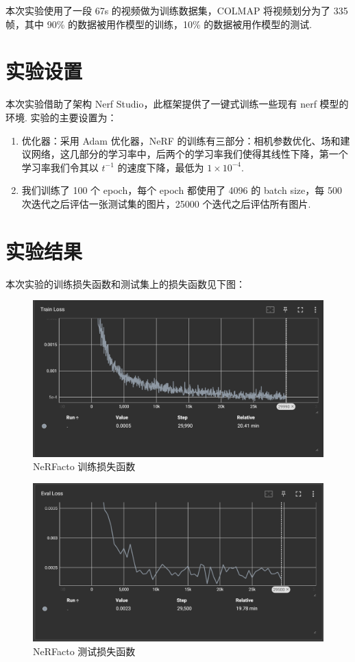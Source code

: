 \documentclass[notitlepage,cs4size,punct,oneside]{ctexrep}
\numberwithin{equation}{chapter}
\theoremstyle{mystyle}
\begin{document}
本次实验使用了一段 67s 的视频做为训练数据集，COLMAP 将视频划分为了 335 帧，其中 90\% 的数据被用作模型的训练，10\% 的数据被用作模型的测试.


\section{实验设置}
本次实验借助了架构 Nerf Studio，此框架提供了一键式训练一些现有 nerf 模型的环境. 实验的主要设置为：
\begin{enumerate}
    \item 优化器：采用 Adam 优化器，NeRF 的训练有三部分：相机参数优化、场和建议网络，这几部分的学习率中，后两个的学习率我们使得其线性下降，第一个学习率我们令其以 $t^{-1}$ 的速度下降，最低为 $1\times 10^{-4}$.

    \item 我们训练了 100 个 epoch，每个 epoch 都使用了 4096 的 batch size，每 500 次迭代之后评估一张测试集的图片，25000 个迭代之后评估所有图片.
\end{enumerate}


\section{实验结果}
本次实验的训练损失函数和测试集上的损失函数见下图：
\begin{figure}[htpb!]
    \centering
    \includegraphics[width=1\linewidth]{nerfloss.png}
    \caption{NeRFacto 训练损失函数}
    \label{fig:enter-label}
\end{figure}

\begin{figure}[htpb!]
    \centering
    \includegraphics[width=1\linewidth]{eval_loss.png}
    \caption{NeRFacto 测试损失函数}
    \label{fig:enter-label}
\end{figure}
\end{document}
